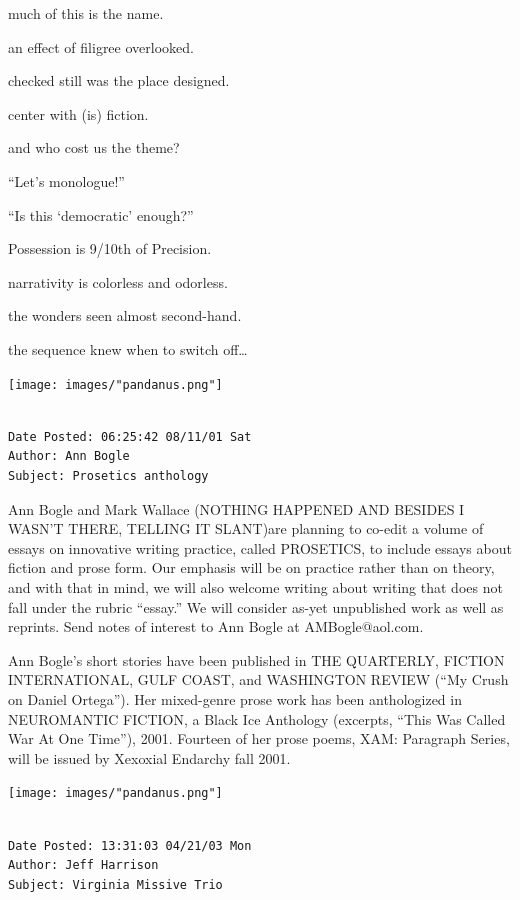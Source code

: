 \documentclass[
]{memoir}
\begin{document}
much of this is the name.

an effect of filigree overlooked.

checked still was the place designed.

center with (is) fiction.

and who cost us the theme?

``Let's monologue!''

``Is this `democratic' enough?''

Possession is 9/10th of Precision.

narrativity is colorless and odorless.

the wonders seen almost second-hand.

the sequence knew when to switch off\ldots{}

\begin{center}\texttt{[image: images/"pandanus.png"]}\end{center}

\begin{verbatim}

Date Posted: 06:25:42 08/11/01 Sat
Author: Ann Bogle
Subject: Prosetics anthology
\end{verbatim}

Ann Bogle and Mark Wallace (NOTHING HAPPENED AND BESIDES I WASN'T THERE,
TELLING IT SLANT)are planning to co-edit a volume of essays on
innovative writing practice, called PROSETICS, to include essays about
fiction and prose form. Our emphasis will be on practice rather than on
theory, and with that in mind, we will also welcome writing about
writing that does not fall under the rubric ``essay.'' We will consider
as-yet unpublished work as well as reprints. Send notes of interest to
Ann Bogle at AMBogle@aol.com.

Ann Bogle's short stories have been published in THE QUARTERLY, FICTION
INTERNATIONAL, GULF COAST, and WASHINGTON REVIEW (``My Crush on Daniel
Ortega''). Her mixed-genre prose work has been anthologized in
NEUROMANTIC FICTION, a Black Ice Anthology (excerpts, ``This Was Called
War At One Time''), 2001. Fourteen of her prose poems, XAM: Paragraph
Series, will be issued by Xexoxial Endarchy fall 2001.

\begin{center}\texttt{[image: images/"pandanus.png"]}\end{center}

\begin{verbatim}

Date Posted: 13:31:03 04/21/03 Mon
Author: Jeff Harrison
Subject: Virginia Missive Trio
\end{verbatim}
\end{document}
